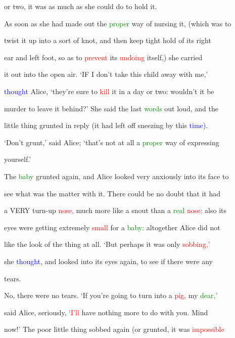  or two, it was as much as she could do to hold it.



 As soon as she had made out the \textcolor{green}{proper} way of nursing it, (which was to

 twist it up into a sort of knot, and then keep tight hold of its right

 ear and left foot, so as to \textcolor{red}{prevent} its \textcolor{red}{undoing} itself,) she carried

 it out into the open air. ‘IF I don’t take this \textcolor{BurntOrange}{child} away with me,’

 \textcolor{blue}{thought} Alice, ‘they’re sure to \textcolor{red}{kill} it in a day or two: wouldn’t it be

 \textcolor{BurntOrange}{murder} to \textcolor{BurntOrange}{leave} it behind?’ She said the last \textcolor{green}{words} out loud, and the

 little thing grunted in reply (it had left off \textcolor{BurntOrange}{sneezing} by this \textcolor{blue}{time).}

 ‘Don’t grunt,’ said Alice; ‘that’s not at all a \textcolor{green}{proper} way of expressing

 yourself.’



 The \textcolor{green}{baby} grunted again, and Alice looked very anxiously into its face to

 see what was the matter with it. There could be no \textcolor{BurntOrange}{doubt} that it had

 a VERY turn-up \textcolor{red}{nose,} much more like a snout than a \textcolor{green}{real} \textcolor{red}{nose;} also its

 eyes were getting extremely \textcolor{red}{small} for a \textcolor{green}{baby:} altogether Alice did not

 like the look of the thing at all. ‘But perhaps it was only \textcolor{red}{sobbing,’}

 she \textcolor{blue}{thought,} and looked into its eyes again, to see if there were any

 tears.



 No, there were no tears. ‘If you’re going to turn into a \textcolor{red}{pig,} my \textcolor{green}{dear,’}

 said Alice, seriously, \textcolor{red}{‘I’ll} have nothing more to do with you. Mind

 now!’ The poor little thing sobbed again (or grunted, it was \textcolor{red}{impossible}

